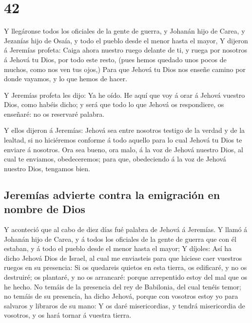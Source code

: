 \hypertarget{section-41}{%
\section{42}\label{section-41}}

 Y llegáronse todos los oficiales de la gente de guerra, y
Johanán hijo de Carea, y Jezanías hijo de Osaía, y todo el pueblo desde
el menor hasta el mayor,  Y dijeron á Jeremías profeta:
Caiga ahora nuestro ruego delante de ti, y ruega por nosotros á Jehová
tu Dios, por todo este resto, (pues hemos quedado unos pocos de muchos,
como nos ven tus ojos,)  Para que Jehová tu Dios nos
enseñe camino por donde vayamos, y lo que hemos de hacer.

 Y Jeremías profeta les dijo: Ya he oído. He aquí que voy
á orar á Jehová vuestro Dios, como habéis dicho; y será que todo lo que
Jehová os respondiere, os enseñaré: no os reservaré palabra.

 Y ellos dijeron á Jeremías: Jehová sea entre nosotros
testigo de la verdad y de la lealtad, si no hiciéremos conforme á todo
aquello para lo cual Jehová tu Dios te enviare á nosotros.
 Ora sea bueno, ora malo, á la voz de Jehová nuestro Dios,
al cual te enviamos, obedeceremos; para que, obedeciendo á la voz de
Jehová nuestro Dios, tengamos bien.

\hypertarget{jeremuxedas-advierte-contra-la-emigraciuxf3n-en-nombre-de-dios}{%
\subsection{Jeremías advierte contra la emigración en nombre de
Dios}\label{jeremuxedas-advierte-contra-la-emigraciuxf3n-en-nombre-de-dios}}

 Y aconteció que al cabo de diez días fué palabra de
Jehová á Jeremías.  Y llamó á Johanán hijo de Carea, y á
todos los oficiales de la gente de guerra que con él estaban, y á todo
el pueblo desde el menor hasta el mayor;  Y díjoles: Así
ha dicho Jehová Dios de Israel, al cual me enviasteis para que hiciese
caer vuestros ruegos en su presencia:  Si os quedareis
quietos en esta tierra, os edificaré, y no os destruiré; os plantaré, y
no os arrancaré: porque arrepentido estoy del mal que os he hecho.
 No temáis de la presencia del rey de Babilonia, del cual
tenéis temor; no temáis de su presencia, ha dicho Jehová, porque con
vosotros estoy yo para salvaros y libraros de su mano:  Y
os daré misericordias, y tendrá misericordia de vosotros, y os hará
tornar á vuestra tierra.

